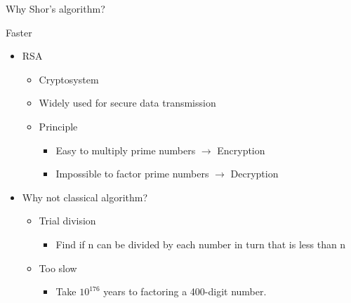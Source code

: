 \begin{frame}{Why Shor's algorithm?}

\begin{block}{Faster}

\begin{itemize}
\item
  RSA

  \begin{itemize}
  \item
    Cryptosystem
  \item
    Widely used for secure data transmission
  \item
    Principle

    \begin{itemize}
    \item
      Easy to multiply prime numbers $\rightarrow$ Encryption
    \item
      Impossible to factor prime numbers $\rightarrow$ Decryption
    \end{itemize}
  \end{itemize}
\item
  Why not classical algorithm?

  \begin{itemize}
  \item
    Trial division

    \begin{itemize}
    \itemsep1pt\parskip0pt
    \item
      Find if n can be divided by each number in turn that is less than
      n
    \end{itemize}
  \item
    Too slow

    \begin{itemize}
    \itemsep1pt\parskip0pt
    \item
      Take $10^{176}$ years to factoring a 400-digit number.
    \end{itemize}
  \end{itemize}
\end{itemize}

\end{block}

\end{frame}


